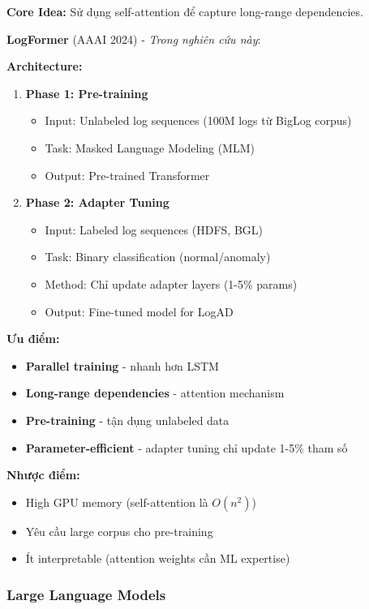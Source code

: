 \textbf{Core Idea:} Sử dụng self-attention để capture long-range dependencies.

\textbf{LogFormer} \cite{guo2024logformer} (AAAI 2024) - \textit{Trong nghiên cứu này}:

\textbf{Architecture:}
\begin{enumerate}
    \item \textbf{Phase 1: Pre-training}
    \begin{itemize}
        \item Input: Unlabeled log sequences (100M logs từ BigLog corpus)
        \item Task: Masked Language Modeling (MLM)
        \item Output: Pre-trained Transformer
    \end{itemize}
    
    \item \textbf{Phase 2: Adapter Tuning}
    \begin{itemize}
        \item Input: Labeled log sequences (HDFS, BGL)
        \item Task: Binary classification (normal/anomaly)
        \item Method: Chỉ update adapter layers (1-5\% params)
        \item Output: Fine-tuned model for LogAD
    \end{itemize}
\end{enumerate}

\textbf{Ưu điểm:}
\begin{itemize}
    \item \textbf{Parallel training} - nhanh hơn LSTM
    \item \textbf{Long-range dependencies} - attention mechanism
    \item \textbf{Pre-training} - tận dụng unlabeled data
    \item \textbf{Parameter-efficient} - adapter tuning chỉ update 1-5\% tham số
\end{itemize}

\textbf{Nhược điểm:}
\begin{itemize}
    \item High GPU memory (self-attention là $O(n^2)$)
    \item Yêu cầu large corpus cho pre-training
    \item Ít interpretable (attention weights cần ML expertise)
\end{itemize}

\subsubsection{Large Language Models}

